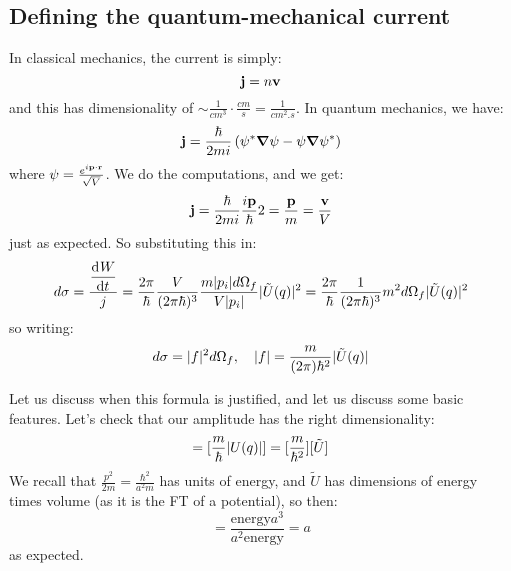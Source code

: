 \subsection{Defining the quantum-mechanical current}
In classical mechanics, the current is simply:
\begin{equation}
    \mathbf{j} = n\mathbf{v}
\end{equation}
and this has dimensionality of $\sim \frac{1}{\si{cm}^3} \cdot \frac{\si{cm}}{s} = \frac{1}{\si{cm^2.s}}$. In quantum mechanics, we have:
\begin{equation}
    \v{j} = \frac{\hbar}{2mi}\left(\psi^* \nabla \psi - \psi \nabla \psi^*\right)
\end{equation}
where $\psi = \frac{e^{i\mathbf{p} \cdot \mathbf{r}}}{\sqrt{V}}$. We do the computations, and we get:
\begin{equation}
    \mathbf{j} = \frac{\hbar}{2mi}\frac{i\mathbf{p}}{\hbar}2 = \frac{\mathbf{p}}{m} = \frac{\mathbf{v}}{V}
\end{equation}
just as expected. So substituting this in:
\begin{equation}
    d\sigma = \frac{\dod{W}{t}}{j} = \frac{2\pi}{\hbar}\frac{V}{(2\pi\hbar)^3}\frac{m\abs{p_i}d\Omega_f}{V\abs{p_i}}\abs{\tilde{U}(q)}^2 = \frac{2\pi}{\hbar}\frac{1}{(2\pi\hbar)^3}m^2d\Omega_f \abs{\tilde{U}(q)}^2
\end{equation}
so writing:
\begin{equation}
    d\sigma = \lvert f \rvert^2d\Omega_f, \quad \lvert f \rvert = \frac{m}{(2\pi)\hbar^2}\lvert \tilde{U}(q) \rvert
\end{equation}

Let us discuss when this formula is justified, and let us discuss some basic features. Let's check that our amplitude has the right dimensionality:
\begin{equation}
    [\abs{f}] = [\frac{m}{\hbar}\abs{U(q)}] = [\frac{m}{\hbar^2}][\tilde{U}]
\end{equation}
We recall that $\frac{p^2}{2m} = \frac{\hbar^2}{a^2m}$ has units of energy, and $\tilde{U}$ has dimensions of energy times volume (as it is the FT of a potential), so then:
\begin{equation}
    [\abs{f}] = \frac{\text{energy} a^3}{a^2\text{energy}} = a
\end{equation}
as expected.

